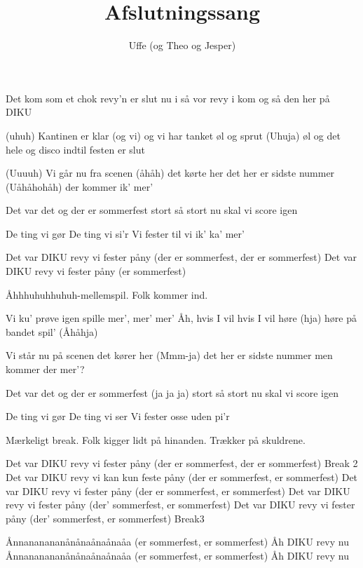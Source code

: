 \documentclass[danish]{article}
\title{Afslutningssang}
\author{Uffe (og Theo og Jesper)}
\begin{document}
\twocolumn[ %
\maketitle


]
\begin{song}

 Det kom som et chok
revy'n er slut nu
i så vor revy
i kom og så den her på DIKU

(uhuh)
Kantinen er klar
(og vi) og vi har tanket øl og sprut
(Uhuja) øl og det hele
og disco indtil festen er slut

(Uuuuh)
Vi går nu fra scenen (åhåh)
det kørte her
det her er sidste nummer (Uåhåhohåh)
der kommer ik' mer'

Det var det
og der er sommerfest
stort så stort
nu skal vi score igen

 De ting vi gør
De ting vi si'r
Vi fester til vi ik' ka' mer'

 Det var DIKU revy
vi fester påny
(der er sommerfest, der er sommerfest)
 Det var DIKU revy
vi fester påny
(er sommerfest)

\scene Åhhhuhuhhuhuh-mellemspil. Folk kommer ind.

 Vi ku' prøve igen
spille mer', mer' mer'
Åh, hvis I vil
hvis I vil høre (hja)
høre på bandet spil' (Åhåhja)

Vi står nu på scenen
det kører her (Mmm-ja)
det her er sidste nummer
men kommer der mer'?

Det var det
og der er sommerfest (ja ja ja)
stort så stort
nu skal vi score igen

 De ting vi gør
De ting vi ser
Vi fester osse uden pi'r

\scene Mærkeligt break. Folk kigger lidt på hinanden. Trækker på skuldrene.

 Det var DIKU revy
vi fester påny
(der er sommerfest, der er sommerfest)
\scene Break 2
 Det var DIKU revy
vi kan kun feste påny
(der er sommerfest, er sommerfest)
 Det var DIKU revy
vi fester påny
(der er sommerfest, er sommerfest)
 Det var DIKU revy
vi fester påny
(der' sommerfest, er sommerfest)
 Det var DIKU revy
vi fester påny
(der' sommerfest, er sommerfest)
\scene Break3

 Ånnananananånånaånaånaåa
(er sommerfest, er sommerfest)
Åh DIKU revy nu
Ånnananananånånaånaånaåa
(er sommerfest, er sommerfest)
Åh DIKU revy nu

\end{song}
\end{document}
